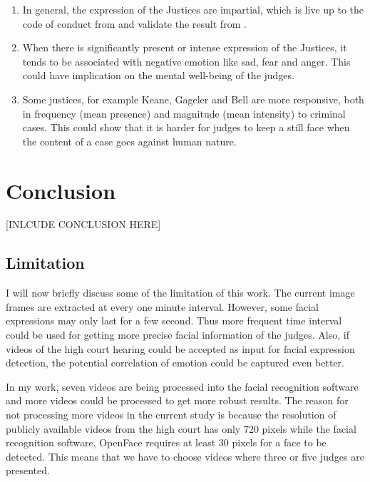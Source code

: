 \documentclass{monashthesis}
\begin{document}
\begin{enumerate}
\def\labelenumi{\arabic{enumi})}
\item
  In general, the expression of the Justices are impartial, which is live up to the code of conduct from \textcite{judicalguid} and validate the result from \textcite{tutton2018judicial}.
\item
  When there is significantly present or intense expression of the Justices, it tends to be associated with negative emotion like sad, fear and anger. This could have implication on the mental well-being of the judges.
\item
  Some justices, for example Keane, Gageler and Bell are more responsive, both in frequency (mean presence) and magnitude (mean intensity) to criminal cases. This could show that it is harder for judges to keep a still face when the content of a case goes against human nature.
\end{enumerate}

\hypertarget{conclusion}{%
\chapter{Conclusion}\label{conclusion}}

{[}INLCUDE CONCLUSION HERE{]}

\hypertarget{limitation}{%
\section{Limitation}\label{limitation}}

I will now briefly discuss some of the limitation of this work. The current image frames are extracted at every one minute interval. However, some facial expressions may only last for a few second. Thus more frequent time interval could be used for getting more precise facial information of the judges. Also, if videos of the high court hearing could be accepted as input for facial expression detection, the potential correlation of emotion could be captured even better.

In my work, seven videos are being processed into the facial recognition software and more videos could be processed to get more robust results. The reason for not processing more videos in the current study is because the resolution of publicly available videos from the high court has only 720 pixels while the facial recognition software, OpenFace requires at least 30 pixels for a face to be detected. This means that we have to choose videos where three or five judges are presented.
\end{document}
